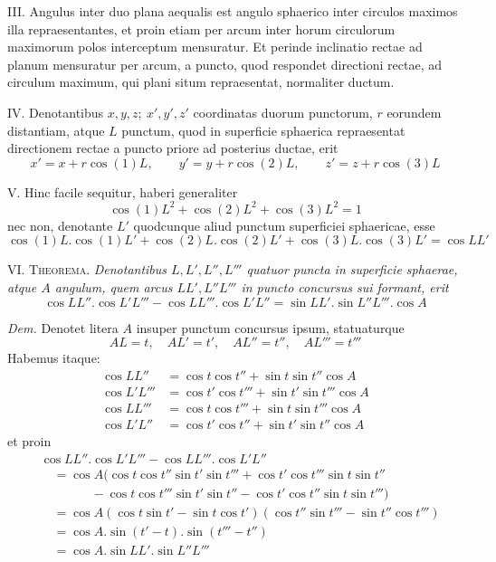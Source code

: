 \par\indent{}%
III. Angulus inter duo plana aequalis est angulo sphaerico inter circulos maximos illa repraesentantes, et proin etiam per arcum inter horum circulorum maximorum polos interceptum mensuratur. Et perinde inclinatio rectae ad planum mensuratur per arcum, a puncto, quod respondet directioni rectae, ad circulum maximum, qui plani situm repraesentat, normaliter ductum.

IV. Denotantibus \(x,y,z;\ x',y',z'\) coordinatas duorum punctorum, \(r\) eorundem distantiam, atque \(L\) punctum, quod in superficie sphaerica repraesentat directionem rectae a puncto priore ad posterius ductae, erit
\[
x'=x+r\cos(1)L,\qquad y'=y+r\cos(2)L,\qquad z'=z+r\cos(3)L
\]
\par\indent V. Hinc facile sequitur, haberi generaliter
\[
\cos(1)L^2+\cos(2)L^2+\cos(3)L^2=1
\]
\noindent nec non, denotante \(L'\) quodcunque aliud punctum superficiei sphaericae, esse
\[
\cos(1)L\mathord{.}\cos(1)L'+\cos(2)L\mathord{.}\cos(2)L'+\cos(3)L\mathord{.}\cos(3)L'=\cos LL'
\]
\par\indent VI. \textsc{Theorema.} \textit{Denotantibus \(L,L',L'',L'''\) quatuor puncta in superficie sphaerae, atque \(A\) angulum, quem arcus \(LL',L''L'''\) in puncto concursus sui formant, erit}
\[
\cos LL''\mathord{.}\cos L'L'''-\cos LL'''\mathord{.}\cos L'L''=\sin LL'\mathord{.}\sin L''L'''\mathord{.}\cos A
\]
\par\indent\textit{Dem.} Denotet litera \(A\) insuper punctum concursus ipsum, statuaturque
\[
AL=t,\quad AL'=t',\quad AL''=t'',\quad AL'''=t'''
\]
\noindent Habemus itaque:
\[
\begin{aligned}
\cos LL''&=\cos t\cos t''+\sin t\sin t''\cos A\\
\cos L'L'''&=\cos t'\cos t'''+\sin t'\sin t'''\cos A\\
\cos LL'''&=\cos t\cos t'''+\sin t\sin t'''\cos A\\
\cos L'L''&=\cos t'\cos t''+\sin t'\sin t''\cos A
\end{aligned}
\]
\noindent et proin
\[
\begin{aligned}
&\cos LL''\mathord{.}\cos L'L'''-\cos LL'''\mathord{.}\cos L'L''\\
&\quad=\cos A(\cos t\cos t''\sin t'\sin t'''+\cos t'\cos t'''\sin t\sin t''\\
&\qquad\qquad-\cos t\cos t'''\sin t'\sin t''-\cos t'\cos t''\sin t\sin t''')\\
&\quad=\cos A(\cos t\sin t'-\sin t\cos t')(\cos t''\sin t'''-\sin t''\cos t''')\\
&\quad=\cos A\mathord{.}\sin(t'-t)\mathord{.}\sin(t'''-t'')\\
&\quad=\cos A\mathord{.}\sin LL'\mathord{.}\sin L''L'''
\end{aligned}
\]

